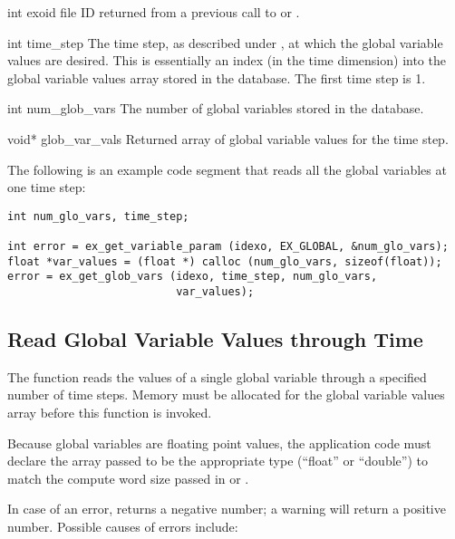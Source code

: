 \begin{parameters}
\item[{int exoid \R{}}]
\exo{} file ID returned from a previous call to  
or .

\item[{int time_step \R{}}]
The time step, as described under , at 
which the global variable values are desired. This is essentially 
an index (in the time dimension) into the global variable values 
array stored in the database. The first time step is 1.

\item[{int num_glob_vars \R{}}]
The number of global variables stored in the database.

\item[{void* glob_var_vals \W{}}]
Returned array of  global variable values 
for the \th{} time step.
\end{parameters}

The following is an example code segment that reads all the global
variables at one time step:

\begin{lstlisting} 
int num_glo_vars, time_step;

int error = ex_get_variable_param (idexo, EX_GLOBAL, &num_glo_vars);
float *var_values = (float *) calloc (num_glo_vars, sizeof(float));
error = ex_get_glob_vars (idexo, time_step, num_glo_vars, 
                          var_values);
\end{lstlisting}



\subsection{Read Global Variable Values through Time}

The function  reads the values of a
single global variable through a specified number of time
steps. Memory must be allocated for the global variable values array
before this function is invoked.

Because global variables are floating point values, the application
code must declare the array passed to be the appropriate type
(``float'' or ``double'') to match the compute word size passed in
 or .

In case of an error,  returns a
negative number; a warning will return a positive number. Possible
causes of errors include:

